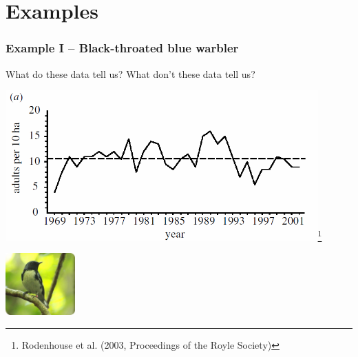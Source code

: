\documentclass[color=usenames,dvipsnames]{beamer}
\begin{document}









\section{Examples}







\begin{frame}[fragile]
  \frametitle{Example I -- Black-throated blue warbler}
  {\centering \large
    What do these data tell us?
    What don't these data tell us? \par}
\begin{center}
  \includegraphics[width=0.9\textwidth]{figs/btbw}\let\thefootnote\relax\footnote{\tiny Rodenhouse et
    al. (2003, Proceedings of the Royle Society)} \\
\end{center}
\hfill \includegraphics[width=0.2\textwidth]{figs/btbw1}
\end{frame}
\end{document}
